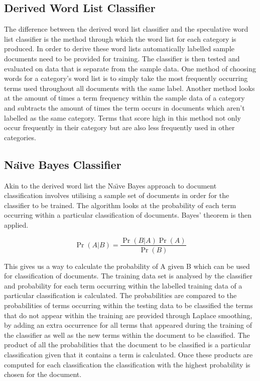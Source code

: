 \documentclass{llncs}
\begin{document}
\subsection{Derived Word List Classifier}
The difference between the derived word list classifier and the speculative word list classifier is the method through which the word list for each category is produced. In order to derive these word lists automatically labelled sample documents need to be provided for training. The classifier is then tested and evaluated on data that is separate from the sample data. One method of choosing words for a category's word list is to simply take the most frequently occurring terms used throughout all documents with the same label. Another method looks at the amount of times a term frequency within the sample data of a category and subtracts the amount of times the term occurs in documents which aren't labelled as the same category. Terms that score high in this method not only occur frequently in their category but are also less frequently used in other categories.

\subsection{Na\"\i ve Bayes Classifier}
Akin to the derived word list the Na\"\i ve Bayes approach to document classification involves utilising a sample set of documents in order for the classifier to be trained. The algorithm looks at the probability of each term occurring within a particular classification of documents. Bayes' theorem is then applied.

\begin{equation}
    \Pr(A|B)=\frac{\Pr(B|A)\Pr(A)}{\Pr(B)}
\end{equation}

This gives us a way to calculate the probability of A given B which can be used for classification of documents. The training data set is analysed by the classifier and probability for each term occurring within the labelled training data of a particular classification is calculated. The probabilities are compared to the probabilities of terms occurring within the testing data to be classified the terms that do not appear within the training are provided through Laplace smoothing, by adding an extra occurrence for all terms that appeared during the training of the classifier as well as the new terms within the document to be classified. The product of all the probabilities that the document to be classified is a particular classification given that it contains a term is calculated. Once these products are computed for each classification the classification with the highest probability is chosen for the document.
\end{document}
